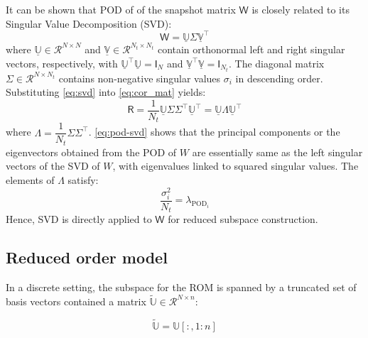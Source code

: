 \documentclass[11pt]{article}
\newcommand{\mat}[1]{\mathsf{#1}}
\begin{document}
    It can be shown that POD of of the snapshot matrix \(\mat{W}\)  is closely related to its Singular Value Decomposition (SVD):
    \begin{equation}
    \mat{W} = \underline{\mathbb{U}}\mat{\Sigma}\underline{\mathbb{V}}^\top
    \label{eq:svd}
    \end{equation}
    where $\underline{\mathbb{U}}\in\mathcal{R}^{N \times N}$ and $\underline{\mathbb{V}}\in\mathcal{R}^{N_t \times N_t}$ contain orthonormal left and right singular vectors, respectively, with $\underline{\mathbb{U}}^\top\underline{\mathbb{U}} = \mat{I}_N$ and $\underline{\mathbb{V}}^\top\underline{\mathbb{V}} = \mat{I}_{N_t}$. The diagonal matrix $\mat{\Sigma}\in\mathcal{R}^{N \times N_t}$ contains non-negative singular values $\sigma_i$ in descending order.
    Substituting \eqref{eq:svd} into \eqref{eq:cor_mat} yields:
    \begin{equation}
    \mat{R} = \frac{1}{N_t} \underline{\mathbb{U}} \mat{\Sigma} \mat{\Sigma}^\top \underline{\mathbb{U}}^\top = \underline{\mathbb{U}}\mat{\Lambda}\underline{\mathbb{U}}^\top
    \label{eq:pod-svd}
    \end{equation}
    where $\mat{\Lambda} = \dfrac{1}{N_t}\mat{\Sigma}\mat{\Sigma}^\top$.
    \cref{eq:pod-svd} shows that the principal components or the eigenvectors obtained from the POD of $W$ are essentially same as the left singular vectors of the SVD of $W$, with eigenvalues linked to squared singular values.
    The elements of $\mat{\Lambda}$ satisfy:
    \begin{equation}
    \frac{\sigma_i^2}{N_t} = \lambda_{\text{POD}_i}
    \label{eq:SVD_POD}
    \end{equation}
    Hence, SVD is directly applied to $\mat{W}$ for reduced subspace construction.




    \subsection{Reduced order model}
    \label{sec:ROM}
    In a discrete setting, the subspace for the ROM  is spanned by a truncated set of basis vectors contained a matrix $\widetilde{\mathbb{U}}\in\mathcal{R}^{N\times n}$:

    \begin{equation}
    \widetilde{\mathbb{U}} = \mathbb{U}[:,1:n]
    \label{eq:U_tilde}
    \end{equation}
\end{document}

